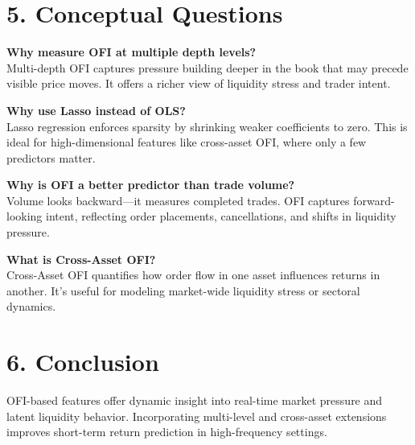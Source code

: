 \documentclass{article}
\begin{document}
\section*{5. Conceptual Questions}

\textbf{Why measure OFI at multiple depth levels?} \\
Multi-depth OFI captures pressure building deeper in the book that may precede visible price moves. It offers a richer view of liquidity stress and trader intent.

\textbf{Why use Lasso instead of OLS?} \\
Lasso regression enforces sparsity by shrinking weaker coefficients to zero. This is ideal for high-dimensional features like cross-asset OFI, where only a few predictors matter.

\textbf{Why is OFI a better predictor than trade volume?} \\
Volume looks backward—it measures completed trades. OFI captures forward-looking intent, reflecting order placements, cancellations, and shifts in liquidity pressure.

\textbf{What is Cross-Asset OFI?} \\
Cross-Asset OFI quantifies how order flow in one asset influences returns in another. It's useful for modeling market-wide liquidity stress or sectoral dynamics.

\section*{6. Conclusion}
OFI-based features offer dynamic insight into real-time market pressure and latent liquidity behavior. Incorporating multi-level and cross-asset extensions improves short-term return prediction in high-frequency settings.
\end{document}
